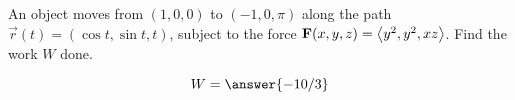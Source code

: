 \documentclass{ximera}
\author{David Guichard \and Neal Koblitz \and H. Jerome Keisler \and Albert Scheller \and Barry Balof \and Mike Wills \and Matthew Carr}
\begin{document}
\begin{exercise}




An object moves from $(1,0,0)$ to $(-1,0,\pi)$ along the path $\vec{r}(t)=(\cos t,\sin t, t)$, subject to the force $\mathbf{F}(x,y,z)=\left\langle y^2,y^2,xz\right\rangle$. Find the work $W$ done.

\begin{prompt}
\[
W=\answer{-10/3}
\]
\end{prompt}



\end{exercise}
\end{document}
